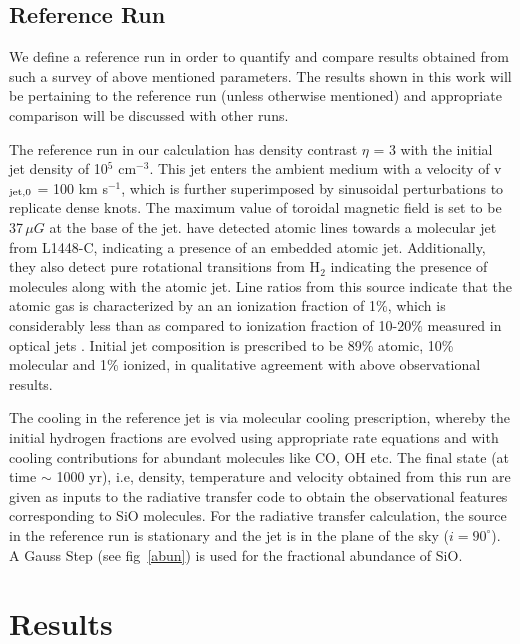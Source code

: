 \documentclass[useAMS,usenatbib]{mn2e}
\begin{document}
\subsection{Reference Run}
\label{ssec:refrun}
We define a reference run in order to quantify and compare results obtained from such a
survey of above mentioned parameters. The results shown in this work will be
pertaining to the reference run (unless otherwise mentioned) and appropriate comparison will be
discussed with other runs. 

The reference run in our calculation has density contrast $\eta$ = 3
with the initial jet density of 10$^{5}$ cm$^{-3}$. This jet enters the
ambient medium with a velocity of v$_{\rm jet,0}$ = 100 km
s$^{-1}$,  which is further superimposed by sinusoidal perturbations to
replicate dense knots. The maximum value of toroidal magnetic field is
set to be 37\,$\mu G$ at the base of the jet.
\cite{Dionatos:2009p15670} have detected atomic lines
towards a molecular jet from L1448-C, indicating a presence of an embedded
atomic jet. Additionally, they also detect pure
rotational transitions from H$_{2}$ indicating the presence of molecules
along with the atomic jet. Line ratios from this source indicate that the
atomic gas is characterized by an an ionization fraction of 1\%,
which is considerably less than as compared to ionization fraction of
10-20\% measured in optical jets \citep{Bacciotti:1995p15970}.
Initial jet composition is prescribed to
be 89\% atomic, 10\% molecular and 1\% ionized, in qualitative
agreement with above observational results. 
%

The cooling in the reference jet is via molecular cooling prescription, whereby
the initial hydrogen fractions are evolved using appropriate rate equations and with cooling 
contributions for abundant molecules like CO, OH
etc. The final state (at time $\sim$ 1000 yr), i.e, density, temperature and velocity obtained from this 
run are given as inputs to the radiative transfer code to obtain the observational features
corresponding to SiO molecules. 
For the radiative transfer calculation, the source in the reference
run is stationary and the jet is in the plane of the sky ($i =
90^{\circ}$). A Gauss Step (see fig~\ref{abun}) is used for the fractional abundance
of SiO. 

\section{Results}
\label{sec:results}
\end{document}
